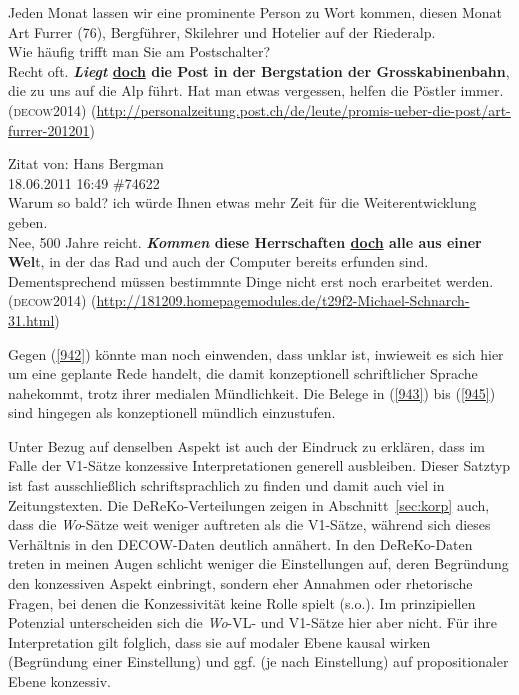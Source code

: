 {\begin{exe}
	\ex\label{944}

	Jeden Monat lassen wir eine prominente Person zu Wort kommen, diesen Monat Art Furrer (76), Bergführer, Skilehrer und Hotelier auf der Riederalp.\medskip\\
	\noindent
	Wie häufig trifft man Sie am Postschalter?\medskip\\
	\noindent
	Recht oft. \textbf{\textit{Liegt} \ul{doch} die Post in der Bergstation der Grosskabinenbahn}, die zu uns auf die Alp führt. Hat man etwas 			vergessen, helfen die Pöstler immer.			      
	\hfill\hbox{\scshape(decow2014)}
	\newline  
	{\scriptsize(\url{http://personalzeitung.post.ch/de/leute/promis-ueber-die-post/art-furrer-201201})}
\end{exe}

\begin{exe}
	\ex\label{945}

	Zitat von: Hans Bergman\\
	18.06.2011 16:49 \#74622\medskip\\
	\noindent
	Warum so bald? ich würde Ihnen etwas mehr Zeit für die Weiterentwicklung geben.\medskip\\
	\noindent
	Nee, 500 Jahre reicht. \textbf{\textit{Kommen} diese Herrschaften \ul{doch} alle aus einer Wel}t, in der das Rad und auch der Computer bereits 		erfunden sind. Dementsprechend müssen bestimmnte Dinge nicht erst noch erarbeitet werden.\hfill\hbox{\scshape(decow2014)}
	\newline  
	{\scriptsize(\url{http://181209.homepagemodules.de/t29f2-Michael-Schnarch-31.html})}
\end{exe}																	           
\pagebreak\largerpage\noindent Gegen (\ref{942}) könnte man noch einwenden, dass unklar ist, inwieweit es sich hier um eine geplante Rede handelt, die damit konzeptionell schriftlicher Sprache nahekommt, trotz ihrer medialen Mündlichkeit. Die Belege in (\ref{943}) bis (\ref{945}) sind hingegen als konzeptionell mündlich einzustufen.

Unter Bezug auf denselben Aspekt ist auch der Eindruck zu erklären, dass im Falle der V1-Sätze konzessive Interpretationen generell ausbleiben. Dieser Satztyp ist fast ausschließlich schriftsprachlich zu finden und damit auch viel in Zeitungstexten. Die DeReKo-Verteilungen zeigen in Abschnitt~\ref{sec:korp} auch, dass die \textit{Wo}-Sätze weit weniger auftreten als die V1-Sätze, während sich dieses Verhältnis in den DECOW-Daten deutlich annähert. In den DeReKo-Daten treten in meinen Augen schlicht weniger die Einstellungen auf, deren Begründung den konzessiven Aspekt einbringt, sondern eher Annahmen oder rhetorische Fragen, bei denen die Konzessivität keine Rolle spielt (s.o.). Im prinzipiellen Potenzial unterscheiden sich die \textit{Wo}-VL- und V1-Sätze hier aber nicht. Für ihre Interpretation gilt folglich, dass sie auf modaler Ebene kausal wirken (Begründung einer Einstellung) und ggf. (je nach Einstellung) auf propositionaler Ebene konzessiv.

}
